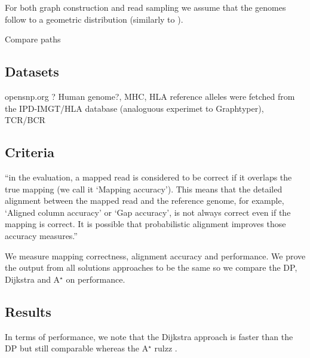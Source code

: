 For both graph construction and read sampling we assume that the genomes follow to a geometric distribution (similarly to \cite{danko2019minerva}).

Compare paths

\subsection{Datasets}
opensnp.org ?
Human genome?, MHC, HLA reference alleles were fetched from the IPD-IMGT/HLA database\cite{robinson2014ipd} (analoguous experimet to Graphtyper\cite{eggertsson2017graphtyper}), TCR/BCR

\subsection{Criteria}
``in the evaluation, a mapped read is considered to be correct if it overlaps the true mapping (we call it ‘Mapping accuracy’). This means that the detailed alignment between the mapped read and the reference genome, for example, ‘Aligned column accuracy’ or ‘Gap accuracy’, is not always correct even if the mapping is correct. It is possible that probabilistic alignment improves those accuracy measures.''\cite{hamada2011probabilistic}

We measure mapping correctness, alignment accuracy and performance.
We prove the output from all solutions approaches to be the same so we compare the DP, Dijkstra and A$^\star$ on performance.

\subsection{Results}
In terms of performance, we note that the Dijkstra approach is faster than the DP but still comparable whereas the A$^\star$ rulzz .
